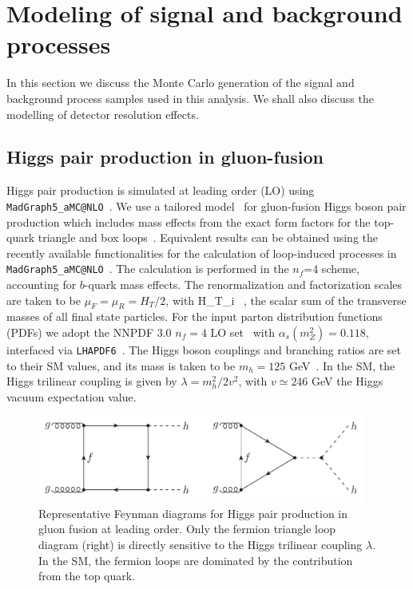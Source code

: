 

\section{Modeling of signal and background processes}
\label{mcgeneration}

In this section we discuss the Monte Carlo generation of the signal and background
process samples used in this analysis.
%
We shall also discuss the modelling of detector
resolution effects.

\subsection{Higgs pair production in gluon-fusion}



Higgs pair production is simulated at leading order (LO) using
{\tt MadGraph5\_aMC@NLO}~\cite{Alwall:2014hca}.
%
We use a tailored  model~\cite{Maltoni:2014eza}
for gluon-fusion Higgs boson pair production
which includes mass effects
from the
exact form factors for the top-quark triangle and box
loops~\cite{Plehn:1996wb}.
%
Equivalent results can be obtained using
the recently available functionalities
for the calculation of loop-induced processes
in {\tt MadGraph5\_aMC@NLO}~\cite{Hirschi:2015iia}.
%
The calculation is performed in the
$n_f$=4 scheme,  accounting for  $b$-quark mass effects. 
The renormalization and factorization
scales are taken to be $\mu_F=\mu_R=H_T/2$,
with
\be
H_T\equiv \sum_i  \, ,
\ee
the scalar sum of the
transverse masses of all final state particles.
%
For the input parton distribution functions (PDFs) we 
adopt the NNPDF 3.0 $n_f=4$ LO set~\cite{Ball:2014uwa} with
$\alpha_s(m_Z^2)=0.118$,
interfaced via {\tt LHAPDF6}~\cite{Buckley:2014ana}.
%
The Higgs boson couplings
and branching ratios are set to their SM values,
and its mass is taken to be
$m_h=125$ GeV~\cite{Aad:2014aba,Khachatryan:2014jba,Aad:2015zhl}.
%
In the SM, the Higgs trilinear coupling
is given by $\lambda=m_h^2/2v^2$, with
$v\simeq 246$ GeV the Higgs vacuum expectation
value.
%


\begin{figure}[t]
\begin{center}
  \includegraphics[width=0.96\textwidth]{plots/hhFeyn.pdf}
  \caption{\small Representative Feynman diagrams
    for Higgs pair production in gluon fusion at
    leading order.
    Only the fermion triangle loop diagram (right) is
    directly sensitive to the Higgs trilinear coupling
    $\lambda$.
    In the SM, the fermion loops are dominated by the
    contribution from the top quark.
}
\label{fig:hhFeyn}
\end{center}
\end{figure}


